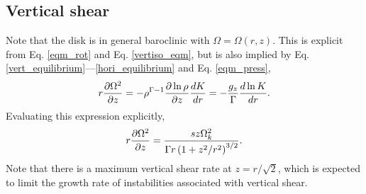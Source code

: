 \subsection{Vertical shear}\label{vshear_def}
Note that the disk is in general baroclinic with $\Omega =
\Omega(r,z)$. This is explicit from Eq. \ref{eqm_rot} and Eq. \ref{vertiso_eqm}, but is also 
implied by Eq. \ref{vert_equilibrium}---\ref{hori_equilibrium} and 
Eq. \ref{eqm_press},  
\begin{align}
  r\frac{\partial\Omega^2}{\partial z} = - \rho^{\Gamma-1}\frac{\partial\ln\rho}{\partial
    z}\frac{dK}{dr} = - \frac{g_z}{\Gamma}\frac{d\ln K}{dr}.\label{vertical_shear}
\end{align}
Evaluating this expression explicitly,
\begin{align}
  r\frac{\partial\Omega^2}{\partial z} = \frac{sz\Omega_k^2}{\Gamma
    r\left(1+z^2/r^2\right)^{3/2}}. \label{vertical_shear_ex} 
\end{align}
Note that there is a maximum vertical shear rate at $z=r/\sqrt{2}$,
which is expected to limit the growth rate of instabilities associated with vertical shear. 


